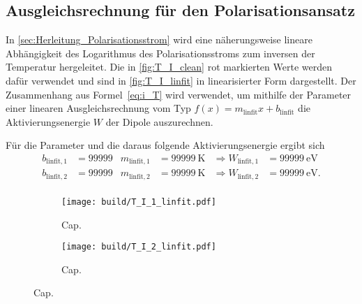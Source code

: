 \subsection{Ausgleichsrechnung für den Polarisationsansatz}
\label{sec:Ausgleichsrechnung_Polarisationsansatz}
In \autoref{sec:Herleitung_Polarisationsstrom} wird eine näherungsweise lineare Abhängigkeit des Logarithmus des Polarisationsstroms zum inversen der Temperatur hergeleitet.
Die in \autoref{fig:T_I_clean} rot markierten Werte werden dafür verwendet und sind in \autoref{fig:T_I_linfit} in linearisierter Form dargestellt.
Der Zusammenhang aus Formel~\eqref{eq:i_T} wird verwendet, um mithilfe der Parameter einer linearen Ausgleichsrechnung vom Typ $f(x) = m_{\text{linfit}}x+b_{\text{linfit}}$ die
Aktivierungsenergie $W$ der Dipole auszurechnen.

Für die Parameter und die daraus folgende Aktivierungsenergie ergibt sich
\begin{align*}
    b_{\text{linfit}, 1} &= \num{99999} & m_{\text{linfit}, 1} &= \qty{99999}{\kelvin} &\Rightarrow W_{\text{linfit}, 1} &= \qty{99999}{\electronvolt} \\
    b_{\text{linfit}, 2} &= \num{99999} & m_{\text{linfit}, 2} &= \qty{99999}{\kelvin} &\Rightarrow W_{\text{linfit}, 2} &= \qty{99999}{\electronvolt}. \\
\end{align*}

\begin{figure}
    \centering
    \begin{subfigure}{\textwidth}
        \centering
        \texttt{[image: build/T\_I\_1\_linfit.pdf]}
        \caption{Cap.}
        \label{fig:T_I_1_linfit}
    \end{subfigure}
    \begin{subfigure}{\textwidth}
        \centering
        \texttt{[image: build/T\_I\_2\_linfit.pdf]}
        \caption{Cap.}
        \label{fig:T_I_2_linfit}
    \end{subfigure}
    \caption{Cap.}
    \label{fig:T_I_linfit}
\end{figure}


